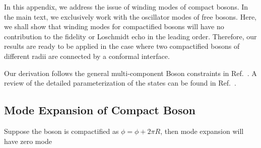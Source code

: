
In this appendix, we address the issue of winding modes of compact bosons. In the main text, we exclusively work with the oscillator modes of free bosons. Here, we shall show that winding modes for compactified bosons will have no contribution to the fidelity or Loschmidt echo in the leading order. Therefore, our results are ready to be applied in the case where two compactified bosons of different radii are connected by a conformal interface\cite{PhysRevLett.118.136801}. 

Our derivation follows the general multi-component Boson constraints in Ref.~. A review of the detailed parameterization of the states can be found in Ref.~. 

\subsection{Mode Expansion of Compact Boson}
Suppose the boson is compactified as $\phi =  \phi + 2\pi R$, then mode expansion will have zero mode

